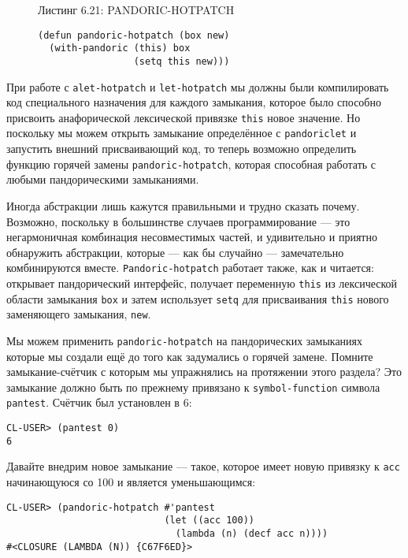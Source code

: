 \begin{figure}Листинг 6.21: PANDORIC-HOTPATCH\label{listing_6.21}
\listbegin
\begin{verbatim}
(defun pandoric-hotpatch (box new)
  (with-pandoric (this) box
                 (setq this new)))
\end{verbatim}
\listend
\end{figure}

При работе с \verb"alet-hotpatch" и \verb"let-hotpatch" мы должны были компилировать код специального назначения для каждого замыкания, которое было способно присвоить анафорической лексической привязке \verb"this" новое значение. Но поскольку мы можем открыть замыкание определённое с \verb"pandoriclet" и запустить внешний присваивающий код, то теперь возможно определить функцию горячей замены \verb"pandoric-hotpatch", которая способная работать с любыми пандорическими замыканиями.

Иногда абстракции лишь кажутся правильными и трудно сказать почему. Возможно, поскольку в большинстве случаев программирование --- это негармоничная комбинация несовместимых частей, и удивительно и приятно обнаружить абстракции, которые --- как бы случайно --- замечательно комбинируются вместе. \verb"Pandoric-hotpatch" работает также, как и читается: открывает пандорический интерфейс, получает переменную \verb"this" из лексической области замыкания \verb"box" и затем использует \verb"setq" для присваивания \verb"this" нового заменяющего замыкания, \verb"new".

Мы можем применить \verb"pandoric-hotpatch" на пандорических замыканиях которые мы создали ещё до того как задумались о горячей замене. Помните замыкание-счётчик с которым мы упражнялись на протяжении этого раздела? Это замыкание должно быть по прежнему привязано к \verb"symbol-function" символа \verb"pantest". Счётчик был установлен в 6:

\begin{verbatim}
CL-USER> (pantest 0)
6
\end{verbatim}

Давайте внедрим новое замыкание --- такое, которое имеет новую привязку к \verb"acc" начинающуюся со 100 и является уменьшающимся:

\begin{verbatim}
CL-USER> (pandoric-hotpatch #'pantest
                            (let ((acc 100))
                              (lambda (n) (decf acc n))))
#<CLOSURE (LAMBDA (N)) {C67F6ED}>
\end{verbatim}

